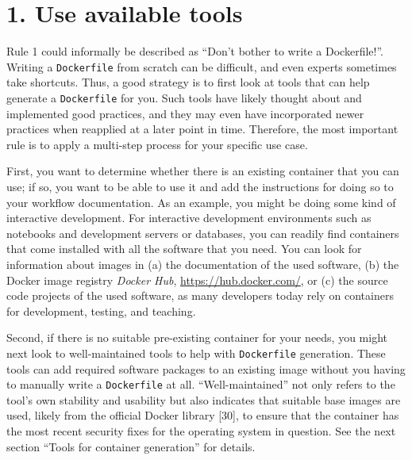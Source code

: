 \documentclass[10pt,letterpaper]{article}
\begin{document}
\normalsize

\newpage

\hypertarget{use-available-tools}{%
\section*{1. Use available tools}\label{use-available-tools}}

  \label{rule:tools} 

Rule 1 could informally be described as ``Don't bother to write a
Dockerfile!''. Writing a \texttt{Dockerfile} from scratch can be
difficult, and even experts sometimes take shortcuts. Thus, a good
strategy is to first look at tools that can help generate a
\texttt{Dockerfile} for you. Such tools have likely thought about and
implemented good practices, and they may even have incorporated newer
practices when reapplied at a later point in time. Therefore, the most
important rule is to apply a multi-step process for your specific use
case.

First, you want to determine whether there is an existing container that
you can use; if so, you want to be able to use it and add the
instructions for doing so to your workflow documentation. As an example,
you might be doing some kind of interactive development. For interactive
development environments such as notebooks and development servers or
databases, you can readily find containers that come installed with all
the software that you need. You can look for information about images in
(a) the documentation of the used software, (b) the Docker image
registry \emph{Docker Hub}, \url{https://hub.docker.com/}, or (c) the
source code projects of the used software, as many developers today rely
on containers for development, testing, and teaching.

Second, if there is no suitable pre-existing container for your needs,
you might next look to well-maintained tools to help with
\texttt{Dockerfile} generation. These tools can add required software
packages to an existing image without you having to manually write a
\texttt{Dockerfile} at all. ``Well-maintained'' not only refers to the
tool's own stability and usability but also indicates that suitable base
images are used, likely from the official Docker library {[}30{]}, to
ensure that the container has the most recent security fixes for the
operating system in question. See the next section ``Tools for container
generation'' for details.
\end{document}
